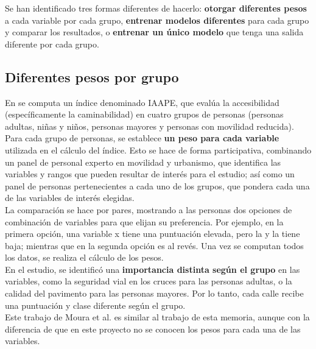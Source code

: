 Se han identificado tres formas diferentes de hacerlo: \textbf{otorgar diferentes pesos} a cada variable por cada grupo, \textbf{entrenar modelos diferentes} para cada grupo y comparar los resultados, o \textbf{entrenar un único modelo} que tenga una salida diferente por cada grupo.
\\

\subsection{Diferentes pesos por grupo}
\label{subsec:perfiles-pesos}



En \textcite{moura2017} se computa un índice denominado IAAPE, que evalúa la accesibilidad (específicamente la caminabilidad) en cuatro grupos de personas (personas adultas, niñas y niños, personas mayores y personas con movilidad reducida).
\\

Para cada grupo de personas, se establece \textbf{un peso para cada variable} utilizada en el cálculo del índice. Esto se hace de forma participativa, combinando un panel de personal experto en movilidad y urbanismo, que identifica las variables y rangos que pueden resultar de interés para el estudio; así como un panel de personas pertenecientes a cada uno de los grupos, que pondera cada una de las variables de interés elegidas.
\\

La comparación se hace por pares, mostrando a las personas dos opciones de combinación de variables para que elijan su preferencia. Por ejemplo, en la primera opción, una variable x tiene una puntuación elevada, pero la y la tiene baja; mientras que en la segunda opción es al revés. Una vez se computan todos los datos, se realiza el cálculo de los pesos.
\\

En el estudio, se identificó una \textbf{importancia distinta según el grupo} en las variables, como la seguridad vial en los cruces para las personas adultas, o la calidad del pavimento para las personas mayores. Por lo tanto, cada calle recibe una puntuación y clase diferente según el grupo.
\\

Este trabajo de Moura et al. es similar al trabajo de esta memoria, aunque con la diferencia de que en este proyecto no se conocen los pesos para cada una de las variables.
\\

